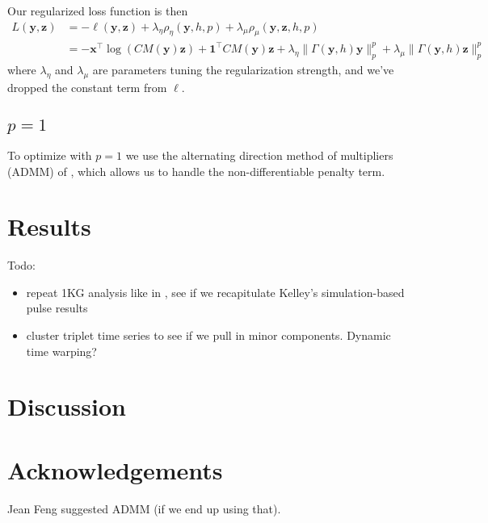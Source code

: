 \documentclass[11pt]{article}
\begin{document}
Our regularized loss function is then
\begin{align}
L(\boldsymbol y, \boldsymbol z) &= - \ell(\boldsymbol y, \boldsymbol z) + \lambda_\eta \rho_\eta(\boldsymbol y, h, p) + \lambda_\mu \rho_\mu(\boldsymbol y, \boldsymbol z, h, p)\\
&= -\boldsymbol x^\intercal\log(C M(\boldsymbol y) \boldsymbol z) + \boldsymbol 1^\intercal C M(\boldsymbol y) \boldsymbol z + \lambda_\eta \|\Gamma(\boldsymbol y, h) \boldsymbol y\|_p^p + \lambda_\mu \|\Gamma(\boldsymbol y, h) \boldsymbol z\|_p^p
\end{align}
where $\lambda_\eta$ and $\lambda_\mu$ are parameters tuning the regularization strength, and we've dropped the constant term from $\ell$.


\subsection{$p=1$}

To optimize with $p=1$ we use the alternating direction method of multipliers (ADMM) of \cite{Boyd2011-dm}, which allows us to handle the non-differentiable penalty term.



\section{Results}\label{sec:results}

Todo:
\begin{itemize}
\item repeat 1KG analysis like in \cite{Harris2017-fw}, see if we recapitulate Kelley's simulation-based pulse results
\item cluster triplet time series to see if we pull in minor components. Dynamic time warping?
\end{itemize}


\section{Discussion}\label{sec:discussion}

\section{Acknowledgements}\label{sec:ack}
Jean Feng suggested ADMM (if we end up using that).



\end{document}
